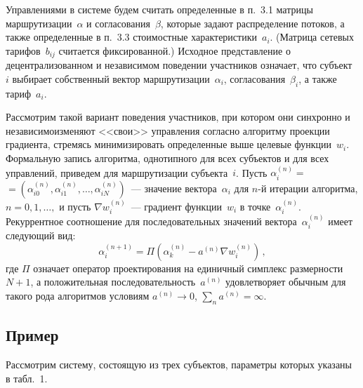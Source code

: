 \begin{multicols}{2}
  Управлениями в системе будем считать определенные в п.~3.1 матрицы 
маршрутизации~$\alpha$ и согласования~$\beta$, которые задают распределение потоков, а 
также определенные в п.~3.3 стоимостные характеристики~$a_i$. (Матрица сетевых 
тарифов~$b_{ij}$ считается фиксированной.) Исходное представление о 
децентрализованном и независимом поведении участников означает, что субъект~$i$ 
выбирает собственный вектор маршрутизации~$\alpha_i$, согласования~$\beta_i$, а также 
тариф~$a_i$.
  
  Рассмотрим такой вариант поведения участников, при котором они синхронно и 
независимо\linebreak изменя\-ют <<свои>> управления согласно алгоритму проекции градиента, 
стремясь минимизировать определенные выше целевые функции~$w_i$. Формальную запись 
алгоритма, однотипного для всех субъектов и для всех управлений, приведем для 
маршрутизации субъекта~$i$. Пусть 
$\alpha_i^{(n)}=$\linebreak $=(\alpha_{i0}^{(n)},\alpha_{i1}^{(n)},\ldots ,\alpha_{iN}^{(n)})$~--- значение 
вектора~$\alpha_i$ для\linebreak
 $n$-й итерации алгоритма, $n=0, 1,\ldots ,$ и пусть $\nabla 
w_i^{(n)}$~--- градиент функции~$w_i$ в точке~$\alpha_i^{(n)}$. Рекуррентное 
соотношение для последовательных значений вектора~$\alpha_i^{(n)}$ имеет следующий 
вид:
  \begin{equation}
  \alpha_i^{(n+1)} =\Pi \left( \alpha_k^{(n)}-a^{(n)}\nabla w_i^{(n)}\right)\,,
  \label{e6konov}
  \end{equation}
где $\Pi$ означает оператор проектирования на единичный симплекс размерности $N+1$, а 
положительная последовательность~$a^{(n)}$ удовлетворяет обычным для такого рода 
алгоритмов условиям $a^{(n)}\rightarrow 0$, $\sum\limits_n a^{(n)}=\infty$.

\subsection{Пример}
  
  Рассмотрим систему, состоящую из трех субъектов, параметры которых указаны в 
табл.~1.
  
\begin{table*}\small
\begin{center}
\vspace*{2ex}


\end{center}
\end{table*}
\end{multicols}
